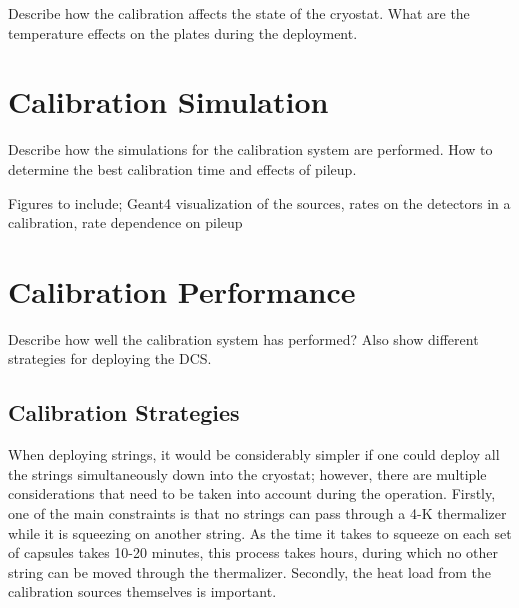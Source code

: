 Describe how the calibration affects the state of the cryostat. What are the temperature effects on the plates during the deployment.


\section{Calibration Simulation}
Describe how the simulations for the calibration system are performed. How to determine the best calibration time and effects of pileup.

Figures to include; Geant4 visualization of the sources, rates on the detectors in a calibration, rate dependence on pileup 

\section{Calibration Performance}

Describe how well the calibration system has performed? Also show different strategies for deploying the DCS.

\subsection{Calibration Strategies}

When deploying strings, it would be considerably simpler if one could deploy all the strings simultaneously down into the cryostat; however, there are multiple considerations that need to be taken into account during the operation.
Firstly, one of the main constraints is that no strings can pass through a 4-K thermalizer while it is squeezing on another string.
As the time it takes to squeeze on each set of capsules takes 10-20 minutes, this process takes hours, during which no other string can be moved through the thermalizer.
Secondly, the heat load from the calibration sources themselves is important.